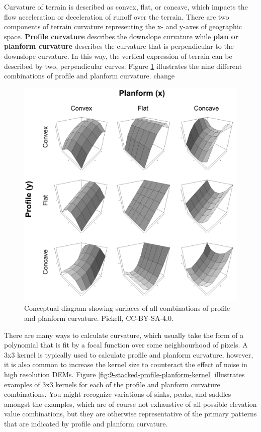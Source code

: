 \documentclass[
]{book}
\begin{document}
Curvature of terrain is described as convex, flat, or concave, which impacts the flow acceleration or deceleration of runoff over the terrain. There are two components of terrain curvature representing the x- and y-axes of geographic space. \textbf{Profile curvature} describes the downslope curvature while \textbf{plan or planform curvature} describes the curvature that is perpendicular to the downslope curvature. In this way, the vertical expression of terrain can be described by two, perpendicular curves. Figure \ref{fig:9-stacked-profile-planform} illustrates the nine different combinations of profile and planform curvature. change

\begin{figure}
\includegraphics[width=0.75\linewidth]{images/09-stacked-profile-planform} \caption{Conceptual diagram showing surfaces of all combinations of profile and planform curvature. Pickell, CC-BY-SA-4.0.}\label{fig:9-stacked-profile-planform}
\end{figure}

There are many ways to calculate curvature, which usually take the form of a polynomial that is fit by a focal function over some neighbourhood of pixels. A 3x3 kernel is typically used to calculate profile and planform curvature, however, it is also common to increase the kernel size to counteract the effect of noise in high resolution DEMs. Figure \ref{fig:9-stacked-profile-planform-kernel} illustrates examples of 3x3 kernels for each of the profile and planform curvature combinations. You might recognize variations of sinks, peaks, and saddles amongst the examples, which are of course not exhaustive of all possible elevation value combinations, but they are otherwise representative of the primary patterns that are indicated by profile and planform curvature.
\end{document}
